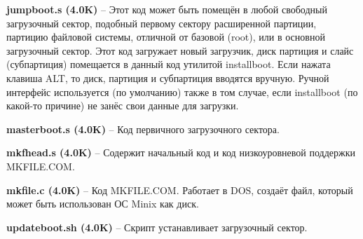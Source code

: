 \textbf{jumpboot.s (4.0K)} -- Этот код может быть помещён в любой свободный загрузочный сектор, подобный первому сектору расширенной партиции, партицию файловой системы, отличной от базовой (root), или в основной загрузочный сектор. Этот код загружает новый загрузчик, диск партиция и слайс (субпартиция) помещается в данный код утилитой installboot. Если нажата клавиша ALT, то диск, партиция и субпартиция вводятся вручную. Ручной интерфейс используется (по умолчанию) также в том случае, если installboot (по какой-то причине) не занёс свои данные для загрузки.

\textbf{masterboot.s (4.0K)} -- Код первичного загрузочного сектора.

\textbf{mkfhead.s (4.0K)} -- Содержит начальный код и код низкоуровневой поддержки MKFILE.COM.

\textbf{mkfile.c (4.0K)} -- Код MKFILE.COM. Работает в DOS, создаёт файл, который может быть использован ОС Minix как диск.

\textbf{updateboot.sh (4.0K)} -- Скрипт устанавливает загрузочный сектор.